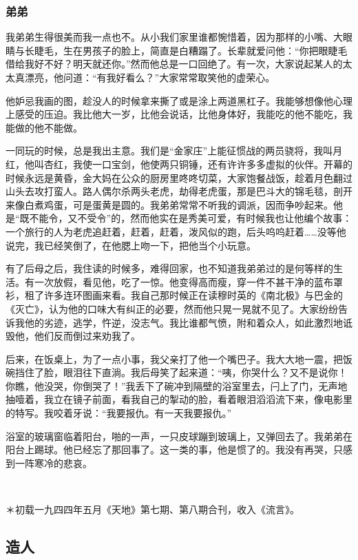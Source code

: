 \subsubsection*{弟弟}
\par 我弟弟生得很美而我一点也不。从小我们家里谁都惋惜着，因为那样的小嘴、大眼睛与长睫毛，生在男孩子的脸上，简直是白糟蹋了。长辈就爱问他：“你把眼睫毛借给我好不好？明天就还你。”然而他总是一口回绝了。有一次，大家说起某人的太太真漂亮，他问道：“有我好看么？”大家常常取笑他的虚荣心。
\par 他妒忌我画的图，趁没人的时候拿来撕了或是涂上两道黑杠子。我能够想像他心理上感受的压迫。我比他大一岁，比他会说话，比他身体好，我能吃的他不能吃，我能做的他不能做。
\par 一同玩的时候，总是我出主意。我们是“金家庄”上能征惯战的两员骁将，我叫月红，他叫杏红，我使一口宝剑，他使两只铜锤，还有许许多多虚拟的伙伴。开幕的时候永远是黄昏，金大妈在公众的厨房里咚咚切菜，大家饱餐战饭，趁着月色翻过山头去攻打蛮人。路人偶尔杀两头老虎，劫得老虎蛋，那是巴斗大的锦毛毯，剖开来像白煮鸡蛋，可是蛋黄是圆的。我弟弟常常不听我的调派，因而争吵起来。他是“既不能令，又不受令”的，然而他实在是秀美可爱，有时候我也让他编个故事：一个旅行的人为老虎追赶着，赶着，赶着，泼风似的跑，后头呜呜赶着……没等他说完，我已经笑倒了，在他腮上吻一下，把他当个小玩意。
\par 有了后母之后，我住读的时候多，难得回家，也不知道我弟弟过的是何等样的生活。有一次放假，看见他，吃了一惊。他变得高而瘦，穿一件不甚干净的蓝布罩衫，租了许多连环图画来看。我自己那时候正在读穆时英的《南北极》与巴金的《灭亡》，认为他的口味大有纠正的必要，然而他只晃一晃就不见了。大家纷纷告诉我他的劣迹，逃学，忤逆，没志气。我比谁都气愤，附和着众人，如此激烈地诋毁他，他们反而倒过来劝我了。
\par 后来，在饭桌上，为了一点小事，我父亲打了他一个嘴巴子。我大大地一震，把饭碗挡住了脸，眼泪往下直淌。我后母笑了起来道：“咦，你哭什么？又不是说你！你瞧，他没哭，你倒哭了！”我丢下了碗冲到隔壁的浴室里去，闩上了门，无声地抽噎着，我立在镜子前面，看我自己的掣动的脸，看着眼泪滔滔流下来，像电影里的特写。我咬着牙说：“我要报仇。有一天我要报仇。”
\par 浴室的玻璃窗临着阳台，啪的一声，一只皮球蹦到玻璃上，又弹回去了。我弟弟在阳台上踢球。他已经忘了那回事了。这一类的事，他是惯了的。我没有再哭，只感到一阵寒冷的悲哀。
\par  
\par ＊初载一九四四年五月《天地》第七期、第八期合刊，收入《流言》。

\subsection{造人}

